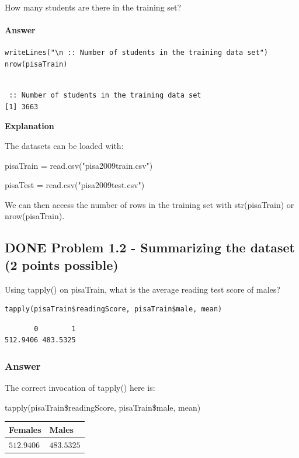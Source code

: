\documentclass[letterpaper, 9pt, onecolumn, twoside, technote, final]{IEEEtran}
\begin{document}
How many students are there in the training set?

\paragraph{Answer}
\label{sec-2-1-3-1}

\begin{verbatim}
writeLines("\n :: Number of students in the training data set")
nrow(pisaTrain)
\end{verbatim}

\begin{verbatim}

 :: Number of students in the training data set
[1] 3663
\end{verbatim}

\textbf{Explanation}

The datasets can be loaded with:

pisaTrain = read.csv("pisa2009train.csv")

pisaTest = read.csv("pisa2009test.csv")

We can then access the number of rows in the training set with
str(pisaTrain) or nrow(pisaTrain).

\subsection{{\bfseries\sffamily DONE} Problem 1.2 - Summarizing the dataset (2 points possible)}
\label{sec-2-2}
Using tapply() on pisaTrain, what is the average reading test score of
males?

\begin{verbatim}
tapply(pisaTrain$readingScore, pisaTrain$male, mean)
\end{verbatim}

\begin{verbatim}
       0        1
512.9406 483.5325
\end{verbatim}

\subsubsection{Answer}
\label{sec-2-2-1}

The correct invocation of tapply() here is:

tapply(pisaTrain\$readingScore, pisaTrain\$male, mean)

\begin{center}
\begin{tabular}{ll}
Females & Males\\
\hline
$512.9406$ & $483.5325$\\
\end{tabular}
\end{center}
\end{document}

